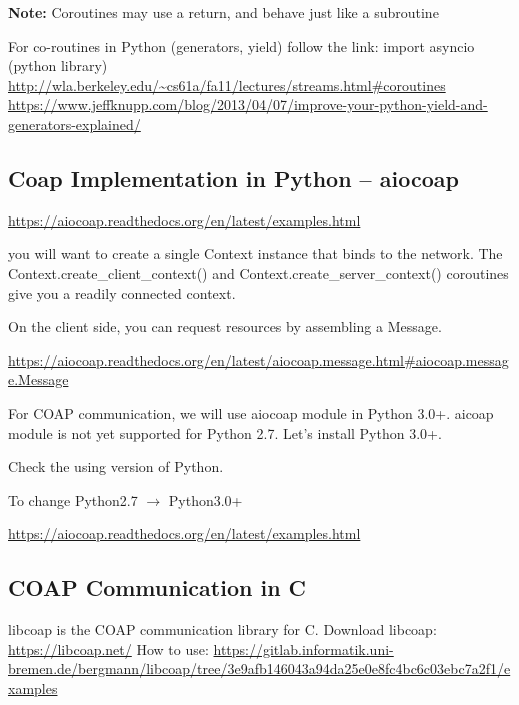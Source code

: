 \documentclass[letterpaper,10pt,english]{sphinxmanual}
\begin{document}
\textbf{Note:} Coroutines may use a return, and behave just like a subroutine

For co-routines in Python (generators, yield) follow the link: import asyncio (python library)
\href{http://wla.berkeley.edu/~cs61a/fa11/lectures/streams.html\#coroutines}{http://wla.berkeley.edu/\textasciitilde{}cs61a/fa11/lectures/streams.html\#coroutines}
\href{https://www.jeffknupp.com/blog/2013/04/07/improve-your-python-yield-and-generators-explained/}{https://www.jeffknupp.com/blog/2013/04/07/improve-your-python-yield-and-generators-explained/}


\subsection{Coap Implementation in Python – aiocoap}
\label{week-10:coap-implementation-in-python-aiocoap}
\href{https://aiocoap.readthedocs.org/en/latest/examples.html}{https://aiocoap.readthedocs.org/en/latest/examples.html}

you will want to create a single Context instance that binds to the network.  The Context.create\_client\_context() and Context.create\_server\_context() coroutines give you a readily connected context.

On the client side, you can request resources by assembling a Message.

\href{https://aiocoap.readthedocs.org/en/latest/aiocoap.message.html\#aiocoap.message.Message}{https://aiocoap.readthedocs.org/en/latest/aiocoap.message.html\#aiocoap.message.Message}

For COAP communication, we will use aiocoap module in Python 3.0+. aicoap module is not yet supported for Python 2.7. Let's install Python 3.0+.

Check the using version of Python.


To change Python2.7 \(\rightarrow\) Python3.0+


\href{https://aiocoap.readthedocs.org/en/latest/examples.html}{https://aiocoap.readthedocs.org/en/latest/examples.html}


\subsection{COAP Communication in C}
\label{week-10:coap-communication-in-c}
libcoap is the COAP communication library for C.
Download libcoap: \href{https://libcoap.net/}{https://libcoap.net/}
How to use: \href{https://gitlab.informatik.uni-bremen.de/bergmann/libcoap/tree/3e9afb146043a94da25e0e8fc4bc6c03ebc7a2f1/examples}{https://gitlab.informatik.uni-bremen.de/bergmann/libcoap/tree/3e9afb146043a94da25e0e8fc4bc6c03ebc7a2f1/examples}
\label{appendix:appendix}
\end{document}
